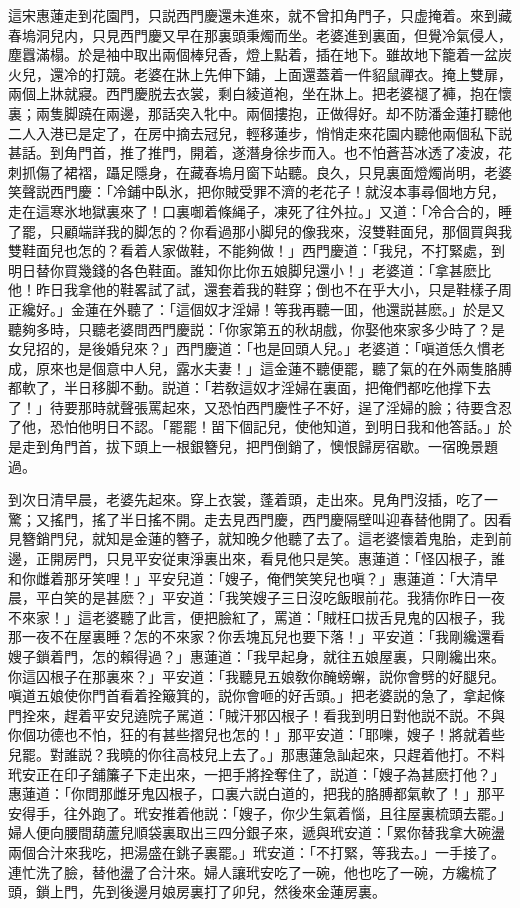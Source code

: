 這宋惠蓮走到花園門，只説西門慶還未進來，就不曾扣角門子，只虚掩着。來到藏春塢洞兒内，只見西門慶又早在那裏頭秉燭而坐。老婆進到裏面，但覺冷氣侵人，塵囂滿榻。於是袖中取出兩個棒兒香，燈上點着，插在地下。雖故地下籠着一盆炭火兒，還冷的打競。老婆在牀上先伸下鋪，上面還蓋着一件貂鼠禪衣。掩上雙扉，兩個上牀就寢。西門慶脱去衣裳，剩白綾道袍，坐在牀上。把老婆褪了褲，抱在懷裏；兩隻脚蹺在兩邊，那話突入牝中。兩個摟抱，正做得好。却不防潘金蓮打聽他二人入港已是定了，在房中摘去冠兒，輕移蓮步，悄悄走來花園内聽他兩個私下説甚話。到角門首，推了推門，開着，遂潛身徐步而入。也不怕蒼苔冰透了凌波，花刺抓傷了裙褶，躡足隱身，在藏春塢月窗下站聽。良久，只見裏面燈燭尚明，老婆笑聲説西門慶：「冷鋪中臥氷，把你賊受罪不濟的老花子！就沒本事尋個地方兒，走在這寒氷地獄裏來了！口裏啣着條䋲子，凍死了往外拉。」又道：「冷合合的，睡了罷，只顧端詳我的脚怎的？你看過那小脚兒的像我來，沒雙鞋面兒，那個買與我雙鞋面兒也怎的？看着人家做鞋，不能夠做！」西門慶道：「我兒，不打緊處，到明日替你買幾錢的各色鞋面。誰知你比你五娘脚兒還小！」老婆道：「拿甚麽比他！昨日我拿他的鞋畧試了試，還套着我的鞋穿；倒也不在乎大小，只是鞋樣子周正纔好。」金蓮在外聽了：「這個奴才淫婦！等我再聽一囬，他還説甚麽。」於是又聽夠多時，只聽老婆問西門慶説：「你家第五的秋胡戲，你娶他來家多少時了？是女兒招的，是後婚兒來？」西門慶道：「也是回頭人兒。」老婆道：「嗔道恁久慣老成，原來也是個意中人兒，露水夫妻！」這金蓮不聽便罷，聽了氣的在外兩隻胳膊都軟了，半日移脚不動。説道：「若敎這奴才淫婦在裏面，把俺們都吃他撑下去了！」待要那時就聲張罵起來，又恐怕西門慶性子不好，逞了淫婦的臉；待要含忍了他，恐怕他明日不認。「罷罷！㽞下個記兒，使他知道，到明日我和他答話。」於是走到角門首，拔下頭上一根銀簪兒，把門倒銷了，懊恨歸房宿歇。一宿晚景題過。

到次日清早晨，老婆先起來。穿上衣裳，蓬着頭，走出來。見角門沒插，吃了一驚；又搖門，搖了半日搖不開。走去見西門慶，西門慶隔壁叫迎春替他開了。因看見簪銷門兒，就知是金蓮的簪子，就知晚夕他聽了去了。這老婆懷着鬼胎，走到前邊，正開房門，只見平安従東淨裏出來，看見他只是笑。惠蓮道：「怪囚根子，誰和你雌着那牙笑哩！」平安兒道：「嫂子，俺們笑笑兒也嗔？」惠蓮道：「大清早晨，平白笑的是甚麽？」平安道：「我笑嫂子三日沒吃飯眼前花。我猜你昨日一夜不來家！」這老婆聽了此言，便把臉紅了，罵道：「賊枉口拔舌見鬼的囚根子，我那一夜不在屋裏睡？怎的不來家？你丢塊瓦兒也要下落！」平安道：「我剛纔還看嫂子鎖着門，怎的賴得過？」惠蓮道：「我早起身，就往五娘屋裏，只剛纔出來。你這囚根子在那裏來？」平安道：「我聽見五娘敎你醃螃蠏，説你會劈的好腿兒。嗔道五娘使你門首看着拴簸箕的，説你會咂的好舌頭。」把老婆説的急了，拿起條門拴來，趕着平安兒遶院子駡道：「賊汗邪囚根子！看我到明日對他説不説。不與你個功德也不怕，狂的有甚些摺兒也怎的！」那平安道：「耶嚛，嫂子！將就着些兒罷。對誰説？我曉的你往高枝兒上去了。」那惠蓮急訕起來，只趕着他打。不料玳安正在印子舖簾子下走出來，一把手將拴奪住了，説道：「嫂子為甚麽打他？」惠蓮道：「你問那雌牙鬼囚根子，口裏六説白道的，把我的胳膊都氣軟了！」那平安得手，往外跑了。玳安推着他説：「嫂子，你少生氣着惱，且往屋裏梳頭去罷。」婦人便向腰間葫蘆兒順袋裏取出三四分銀子來，遞與玳安道：「累你替我拿大碗盪兩個合汁來我吃，把湯盛在銚子裏罷。」玳安道：「不打緊，等我去。」一手接了。連忙洗了臉，替他盪了合汁來。婦人讓玳安吃了一碗，他也吃了一碗，方纔梳了頭，鎖上門，先到後邊月娘房裏打了卯兒，然後來金蓮房裏。

